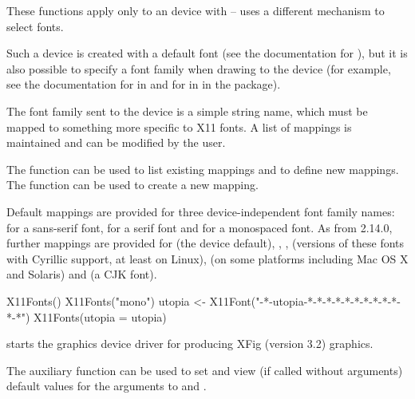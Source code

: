 \begin{Details}\relax
These functions apply only to an  device with
 --  uses a different
mechanism to select fonts.

Such a  device is created with a default font (see
the documentation for ), but it is also possible
to specify a font family when drawing to the device (for example, see
the documentation for  in  and for
 in  in the  package).

The font family sent to the device is a simple string name, which must be
mapped to something more specific to X11 fonts.  A list of
mappings is maintained and can be modified by the user.

The  function can be used to list existing
mappings and to define new mappings.  The 
function can be used to create a new mapping.

Default mappings are provided for three device-independent font family
names:  for a sans-serif font,  for a serif
font and  for a monospaced font.  As from \R{} 2.14.0,
further mappings are provided for  (the device
default), , , 
(versions of these fonts with Cyrillic support, at least on Linux),
 (on some platforms including Mac OS X and Solaris) and
 (a CJK font).
\end{Details}
%
\begin{SeeAlso}\relax
{}
\end{SeeAlso}
%
\begin{Examples}
\begin{ExampleCode}
X11Fonts()
X11Fonts("mono")
utopia <- X11Font("-*-utopia-*-*-*-*-*-*-*-*-*-*-*-*")
X11Fonts(utopia = utopia)
\end{ExampleCode}
\end{Examples}
%
\begin{Description}\relax
{} starts the graphics device driver for producing XFig
(version 3.2) graphics.

The auxiliary function  can be used to set and view
(if called without arguments) default values for the arguments to
 and .
\end{Description}
